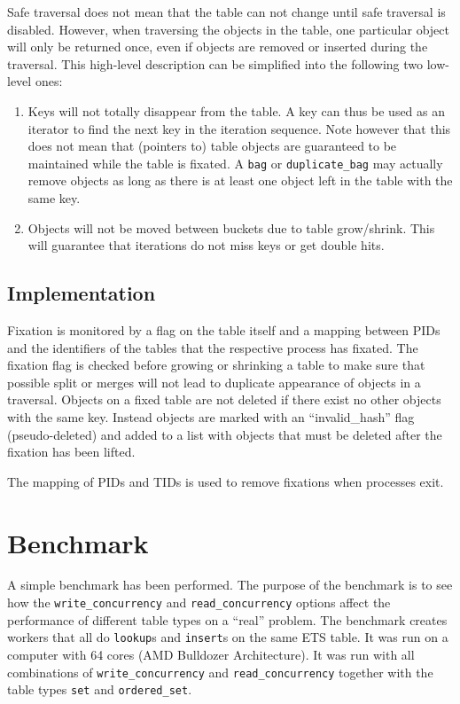 \documentclass[aps,pre,preprint,nofootinbib]{revtex4}
\begin{document}
Safe traversal does not mean that the table can not change until safe traversal is disabled.
However, when traversing the objects in the table, one particular object will only be returned once, even if objects are removed or inserted during the traversal.
This high-level description can be simplified into the following two low-level ones:

\begin{enumerate}
\item Keys will not totally disappear from the table.
  A key can thus be used as an iterator to find the next key in the iteration sequence.
  Note however that this does not mean that (pointers to) table objects are guaranteed to be maintained while the table is fixated.
  A \verb|bag| or \verb|duplicate_bag| may actually remove objects as long as there is at least one object left in the table with the same key.
\item Objects will not be moved between buckets due to table grow/shrink.
  This will guarantee that iterations do not miss keys or get double hits.
\end{enumerate}

\subsection{Implementation}

Fixation is monitored by a flag on the table itself and a mapping between PIDs and the identifiers of the tables that the respective process has fixated.
The fixation flag is checked before growing or shrinking a table to make sure that possible split or merges will not lead to duplicate appearance of objects in a traversal.
Objects on a fixed table are not deleted if there exist no other objects with the same key.
Instead objects are marked with an ``invalid\_hash'' flag (pseudo-deleted) and added to a list with objects that must be deleted after the fixation has been lifted.

The mapping of PIDs and TIDs is used to remove fixations when processes exit.

\section{Benchmark} \label{sec:benchmark}

A simple benchmark has been performed.
The purpose of the benchmark is to see how the \verb|write_concurrency| and \verb|read_concurrency| options affect the performance of different table types on a ``real'' problem.
The benchmark creates workers that all do \verb|lookup|s and \verb|insert|s on the same ETS table.
It was run on a computer with 64 cores (AMD Bulldozer Architecture).
It was run with all combinations of \verb|write_concurrency| and \verb|read_concurrency| together with the table types \verb|set| and \verb|ordered_set|.
\end{document}
